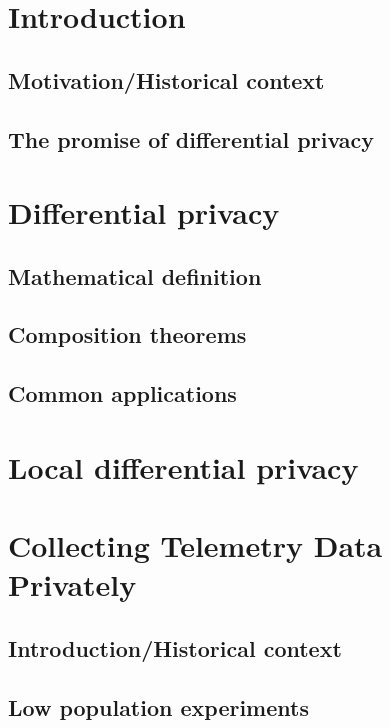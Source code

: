 \documentclass[12pt]{article}
\begin{document}
\section{Introduction}

\subsection{Motivation/Historical context}

\subsection{The promise of differential privacy}

\section{Differential privacy}

\subsection{Mathematical definition}

\subsection{Composition theorems}

\subsection{Common applications}

\section{Local differential privacy}

\section{Collecting Telemetry Data Privately}

\subsection{Introduction/Historical context}

\subsection{Low population experiments}

\cite{test}




\end{document}
